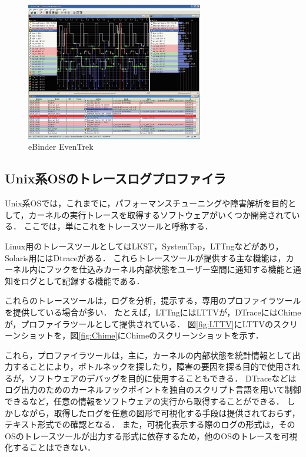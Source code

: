 \begin{figure}
\begin{center}
\includegraphics[height=6cm]{EvenTrek.eps}
\caption{eBinder EvenTrek}
\label{fig:EvenTrek}
\end{center}
\end{figure}

\subsection*{Unix系OSのトレースログプロファイラ}

Unix系OSでは，これまでに，パフォーマンスチューニングや障害解析を目的として，カーネルの実行トレースを取得するソフトウェアがいくつか開発されている．
ここでは，単にこれをトレースツールと呼称する．

Linux用のトレースツールとしてはLKST\cite{LKST}，SystemTap\cite{SystemTap}，LTTng\cite{LTTng}などがあり，Solaris用にはDtrace\cite{Dtrace}がある．
これらトレースツールが提供する主な機能は，カーネル内にフックを仕込みカーネル内部状態をユーザー空間に通知する機能と通知をログとして記録する機能である．

これらのトレースツールは，ログを分析，提示する，専用のプロファイラツールを提供している場合が多い．
たとえば，LTTngにはLTTV\cite{LTTV}が，DTraceにはChime\cite{Chime}が，プロファイラツールとして提供されている．
図\ref{fig:LTTV}にLTTVのスクリーンショットを，図\ref{fig:Chime}にChimeのスクリーンショットを示す．

これら，プロファイラツールは，主に，カーネルの内部状態を統計情報として出力することにより，ボトルネックを探したり，障害の要因を探る目的で使用されるが，ソフトウェアのデバッグを目的に使用することもできる．
DTraceなどはログ出力のためのカーネルフックポイントを独自のスクリプト言語を用いて制御できるなど，任意の情報をソフトウェアの実行から取得することができる．
しかしながら，取得したログを任意の図形で可視化する手段は提供されておらず，テキスト形式での確認となる．
また，可視化表示する際のログの形式は，そのOSのトレースツールが出力する形式に依存するため，他のOSのトレースを可視化することはできない．

